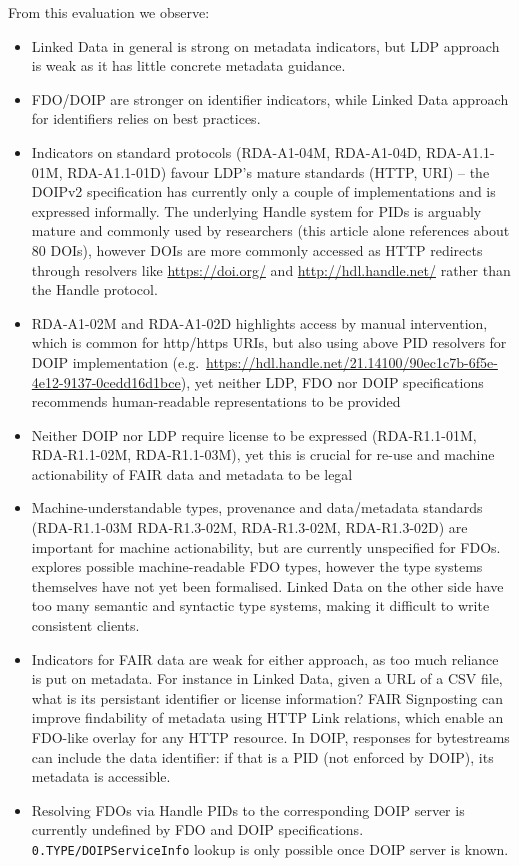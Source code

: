 From this evaluation we observe:

\begin{itemize}
\item
  Linked Data in general is strong on metadata indicators, but LDP approach is weak as it has little concrete metadata guidance.
\item
  FDO/DOIP are stronger on identifier indicators, while Linked Data approach for identifiers relies on best practices. 
\item
  Indicators on standard protocols (RDA-A1-04M, RDA-A1-04D, RDA-A1.1-01M, RDA-A1.1-01D) favour LDP's mature standards (HTTP, URI) -- the DOIPv2 specification \cite{DONA 2018} has currently only a couple of implementations and is expressed informally. The underlying Handle system for PIDs is arguably mature and commonly used by researchers (this article alone references about 80 DOIs), however DOIs are more commonly accessed as HTTP redirects through resolvers like \url{https://doi.org/} and \url{http://hdl.handle.net/} rather than the Handle protocol.
\item
  RDA-A1-02M and RDA-A1-02D highlights access by manual intervention, which is common for http/https URIs, but also using above PID resolvers for DOIP implementation  (e.g.~\url{https://hdl.handle.net/21.14100/90ec1c7b-6f5e-4e12-9137-0cedd16d1bce}), yet neither LDP, FDO nor DOIP specifications recommends human-readable representations to be provided
\item
  Neither DOIP nor LDP require license to be expressed (RDA-R1.1-01M, RDA-R1.1-02M, RDA-R1.1-03M), yet this is crucial for re-use and machine actionability of FAIR data and metadata to be legal
\item
  Machine-understandable types, provenance and data/metadata standards (RDA-R1.1-03M RDA-R1.3-02M, RDA-R1.3-02M, RDA-R1.3-02D) are important for machine actionability, but are currently unspecified for FDOs. \cite{fdo-ImplAttributesTypesProfiles} explores possible machine-readable FDO types, however the type systems themselves have not yet been formalised. Linked Data on the other side have too many semantic and syntactic type systems, making it difficult to write consistent clients.
\item
  Indicators for FAIR data are weak for either approach, as too much reliance is put on metadata. For instance in Linked Data, given a URL of a CSV file, what is its persistant identifier or license information? FAIR Signposting \cite{vandesompel2015} can improve findability of metadata using HTTP Link relations, which enable an FDO-like overlay for any HTTP resource. In DOIP, responses for bytestreams can include the data identifier: if that is a PID (not enforced by DOIP), its metadata is accessible.
\item
  Resolving FDOs via Handle PIDs to the corresponding DOIP server is currently undefined by FDO and DOIP specifications. \texttt{0.TYPE/DOIPServiceInfo} lookup is only possible once DOIP server is known.
\end{itemize}


